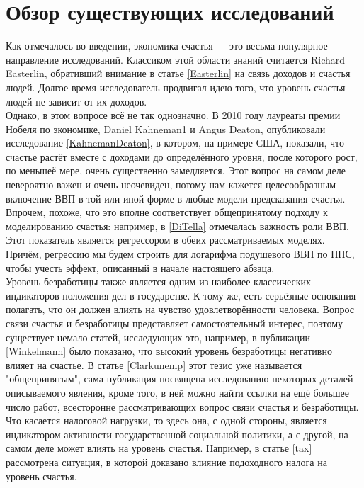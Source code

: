 \documentclass[russian]{vegareport}
\begin{document}
        \section{Обзор существующих исследований} \label{review}
        Как отмечалось во введении, экономика счастья --- это весьма популярное направление исследований. Классиком этой области знаний считается Richard Easterlin, обративший внимание в статье \ref{Easterlin} на связь доходов и счастья людей. Долгое время исследователь продвигал идею того, что уровень счастья людей не зависит от их доходов.
        \\
        Однако, в этом вопросе всё не так однозначно. В 2010 году лауреаты премии Нобеля по экономике, Daniel Kahneman1 и Angus Deaton, опубликовали исследование \ref{KahnemanDeaton}, в котором, на примере США, показали, что счастье растёт вместе с доходами до определённого уровня, после которого рост, по меньшеё мере, очень существенно замедляется. Этот вопрос на самом деле невероятно важен и очень неочевиден, потому нам кажется целесообразным включение ВВП в той или иной форме в любые модели предсказания счастья. Впрочем, похоже, что это вполне соответствует общепринятому подходу к моделированию счастья: например, в \ref{DiTella} отмечалась важность роли ВВП. Этот показатель является регрессором в обеих рассматриваемых моделях. Причём, регрессию мы будем строить для логарифма подушевого ВВП по ППС, чтобы учесть эффект, описанный в начале настоящего абзаца.
        \\
        Уровень безработицы также является одним из наиболее классических индикаторов положения дел в государстве. К тому же, есть серьёзные основания полагать, что он должен влиять на чувство удовлетворённости человека. Вопрос связи счастья и безработицы представляет самостоятельный интерес, поэтому существует немало статей, исследующих это, например, в публикации \ref{Winkelmann} было показано, что высокий уровень безработицы негативно влияет на счастье. В статье \ref{Clarkunemp} этот тезис уже называется "общепринятым", сама публикация посвящена исследованию некоторых деталей описываемого явления, кроме того, в ней можно найти ссылки на ещё большее число работ, всесторонне рассматривающих вопрос связи счастья и безработицы.
        \\
        Что касается налоговой нагрузки, то здесь она, с одной стороны, является индикатором активности государственной социальной политики, а с другой, на самом деле может влиять на уровень счастья. Например, в статье \ref{tax} рассмотрена ситуация, в которой доказано влияние подоходного налога на уровень счастья.
\end{document}
